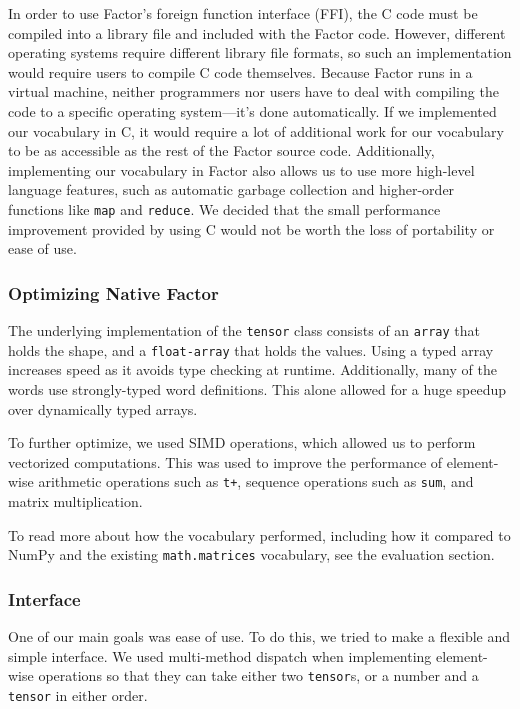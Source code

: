 \documentclass[
]{article}
\begin{document}
In order to use Factor's foreign function interface (FFI), the C code
must be compiled into a library file and included with the Factor code.
However, different operating systems require different library file
formats, so such an implementation would require users to compile C code
themselves. Because Factor runs in a virtual machine, neither
programmers nor users have to deal with compiling the code to a specific
operating system---it's done automatically. If we implemented our
vocabulary in C, it would require a lot of additional work for our
vocabulary to be as accessible as the rest of the Factor source code.
Additionally, implementing our vocabulary in Factor also allows us to
use more high-level language features, such as automatic garbage
collection and higher-order functions like \texttt{map} and
\texttt{reduce}. We decided that the small performance improvement
provided by using C would not be worth the loss of portability or ease
of use.

\hypertarget{optimizing-native-factor}{%
\subsubsection{Optimizing Native
Factor}\label{optimizing-native-factor}}

The underlying implementation of the \texttt{tensor} class consists of
an \texttt{array} that holds the shape, and a \texttt{float-array} that
holds the values. Using a typed array increases speed as it avoids type
checking at runtime. Additionally, many of the words use strongly-typed
word definitions. This alone allowed for a huge speedup over dynamically
typed arrays.

To further optimize, we used SIMD operations, which allowed us to
perform vectorized computations. This was used to improve the
performance of element-wise arithmetic operations such as \texttt{t+},
sequence operations such as \texttt{sum}, and matrix multiplication.

To read more about how the vocabulary performed, including how it
compared to NumPy and the existing \texttt{math.matrices} vocabulary,
see the evaluation section.

\hypertarget{interface}{%
\subsubsection{Interface}\label{interface}}

One of our main goals was ease of use. To do this, we tried to make a
flexible and simple interface. We used multi-method dispatch when
implementing element-wise operations so that they can take either two
\texttt{tensor}s, or a number and a \texttt{tensor} in either order.
\end{document}
